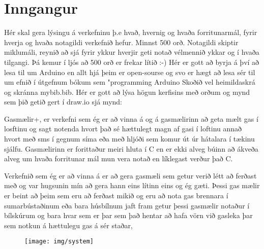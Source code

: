 \section{Inngangur}
Hér skal gera lýsingu á verkefninu þ.e hvað,  hvernig og  hvaða forritunarmál, fyrir hverja og hvaða notagildi verkefnið hefur. Minnst 500 orð. Notagildi skiptir miklumáli, reynið að sjá fyrir ykkur hverjir geti notað vélmennið ykkar og í hvaða tilgangi.  Þá kemur í ljós að 500 orð er frekar lítið :-) Hér er gott að byrja á því að lesa til um Arduino en allt hjá þeim er open-sourse og svo er hægt að lesa sér til um efnið í útgefnum bókum sem "programming Arduino \cite{monk} Skoðið vel heimildaskrá og skránna mybib.bib. Hér er gott að lýsa högun kerfisins með orðum og mynd sem þið getið gert í draw.io sjá mynd: 

Gasmælir+, er verkefni sem ég er að vinna á og á gasmælirinn að geta mælt gas í losftinu og sagt notenda hvort það sé hættulegt magn af gasi í loftinu annað hvort með sms í gegnum síma eða með hljóði sem komur út úr hátalara í tækinu sjálfu. Gasmælirinn er forittaður meiri hluta í C en er ekki alveg búinn að ákveða alveg um hvaða forritunar mál mun vera notað en líklegast verður það C. 

Verkefnið sem ég er að vinna á er að gera gasmæli sem getur verið létt að ferðast með og var hugsunin mín að gera hann eins lítinn eins og ég gæti. Þessi gas mælir er beint að þeim sem eru að ferðast mikið og eru að nota gas brennara í sumarbústaðinum eða bara húsbílnum jaft fram getur þessi gasmælir notaður í bílskúrum og bara hvar sem er þar sem það hentar að hafa vörn við gasleka þar sem notkun á hættulegu gas á sér staðar,

\begin{figure}[h]
\texttt{[image: img/system]}
\end{figure}